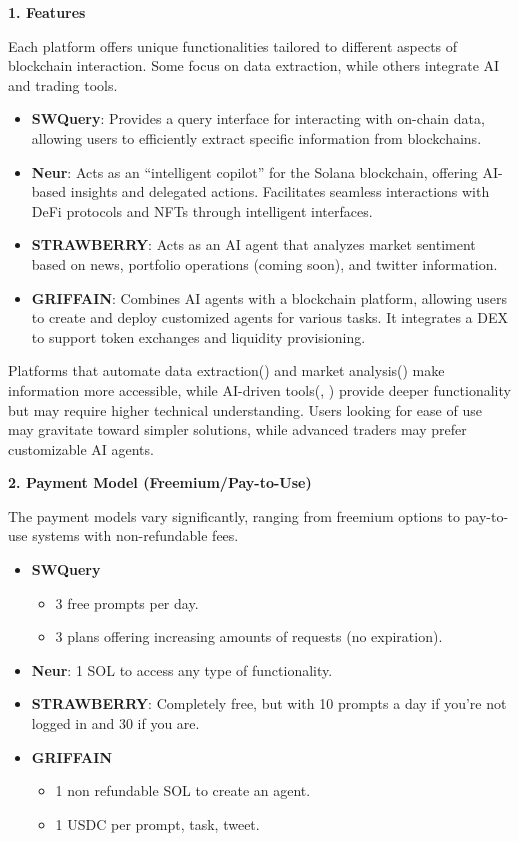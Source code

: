 \documentclass[
]{article}
\providecommand{\tightlist}{%
  \setlength{\itemsep}{0pt}\setlength{\parskip}{0pt}}
\begin{document}
\textbf{1. Features}

Each platform offers unique functionalities tailored to different
aspects of blockchain interaction. Some focus on data extraction, while
others integrate AI and trading tools.

\begin{itemize}
\tightlist
\item
  \textbf{SWQuery}: Provides a query interface for interacting with
  on-chain data, allowing users to efficiently extract specific
  information from blockchains.
\item
  \textbf{Neur}: Acts as an ``intelligent copilot'' for the Solana
  blockchain, offering AI-based insights and delegated actions.
  Facilitates seamless interactions with DeFi protocols and NFTs through
  intelligent interfaces.
\item
  \textbf{STRAWBERRY}: Acts as an AI agent that analyzes market
  sentiment based on news, portfolio operations (coming soon), and
  twitter information.
\item
  \textbf{GRIFFAIN}: Combines AI agents with a blockchain platform,
  allowing users to create and deploy customized agents for various
  tasks. It integrates a DEX to support token exchanges and liquidity
  provisioning.
\end{itemize}

Platforms that automate data extraction(\cite{swquery2025}) and market
analysis(\cite{strawberry2025}) make information more accessible, while AI-driven
tools(\cite{neur2025}, \cite{griffain2025}) provide deeper functionality but may require
higher technical understanding. Users looking for ease of use may
gravitate toward simpler solutions, while advanced traders may prefer
customizable AI agents.

\textbf{2. Payment Model (Freemium/Pay-to-Use)}

The payment models vary significantly, ranging from freemium options to
pay-to-use systems with non-refundable fees.

\begin{itemize}
\tightlist
\item
  \textbf{SWQuery}

  \begin{itemize}
  \tightlist
  \item
    3 free prompts per day.
  \item
    3 plans offering increasing amounts of requests (no expiration).
  \end{itemize}
\item
  \textbf{Neur}: 1 SOL to access any type of functionality.
\item
  \textbf{STRAWBERRY}: Completely free, but with 10 prompts a day if
  you're not logged in and 30 if you are.
\item
  \textbf{GRIFFAIN}

  \begin{itemize}
  \tightlist
  \item
    1 non refundable SOL to create an agent.
  \item
    1 USDC per prompt, task, tweet.
  \end{itemize}
\end{itemize}
\end{document}

